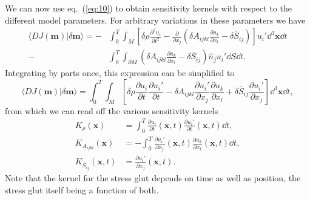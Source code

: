 We can now use eq.~(\ref{eq:10}) to obtain sensitivity kernels with respect to the different model parameters. For arbitrary 
variations in these parameters we have
\begin{align}
\langle DJ(\mathbf{m})|\delta \mathbf{m}\rangle = -&\int_{0}^{T}\int_{M}\left[\delta\rho\frac{\partial^{2}u_{i}}{\partial t^{2}}-\frac{\partial}{\partial x_{j}}\left(\delta A_{ijkl}\frac{\partial u_{k}}{\partial x_{l}}-\delta\overline{S}_{ij}\right)\right]u_{i}'\dd^{3}\mathbf{x}\dd t \nonumber \\
-&\int_{0}^{T}\int_{\partial M}\left(\delta A_{ijkl}\frac{\partial u_{k}}{\partial x_{l}}-\delta\overline{S}_{ij}\right)\hat{n}_{j}u_{i}'\dd S\dd t.
\label{eq:29}
\end{align}
Integrating by parts once, this expression can be simplified to
\begin{equation}
\langle DJ(\mathbf{m})|\delta \mathbf{m}\rangle=\int_{0}^{T}\int_{M}\left[\delta\rho\frac{\partial u_{i}}{\partial t}\frac{\partial u_{i}'}{\partial t}-\delta A_{ijkl}\frac{\partial u_{i}'}{\partial x_{j}}\frac{\partial u_{k}}{\partial x_{l}}+\delta\overline{S}_{ij}\frac{\partial u_{i}'}{\partial x_{j}}\right]\dd^{3}\mathbf{x}\dd t,
\label{eq:30}
\end{equation}
from which we can read off the various sensitivity kernels
\begin{align}
K_{\rho}(\mathbf{x})&=\int_{0}^{T}\frac{\partial u_{i}}{\partial t}(\mathbf{x},t)\frac{\partial u_{i}'}{\partial t}(\mathbf{x},t)\dd t, \label{eq:31} \\
K_{A_{ijkl}}(\mathbf{x})&=-\int_{0}^{T}\frac{\partial u_{i}'}{\partial x_{j}}(\mathbf{x},t)\frac{\partial u_{k}}{\partial x_{l}}(\mathbf{x},t)\dd t, \label{eq:32} \\
K_{\overline{S}_{ij}}(\mathbf{x},t)&= \frac{\partial u_{i}'}{\partial x_{j}}(\mathbf{x},t).
\label{eq:33}
\end{align}
Note that the kernel for the stress glut depends on time as well as position, the stress glut itself being a function of both.

